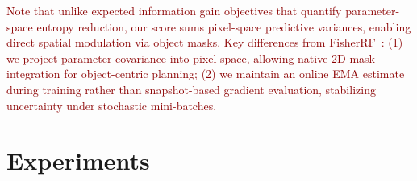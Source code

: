 \documentclass{egpubl}
\newcommand{\rev}[1]{\textcolor{darkred}{#1}}
\begin{document}
\rev{Note that unlike expected information gain objectives that quantify parameter-space entropy reduction, our score sums pixel-space predictive variances, enabling direct spatial modulation via object masks. Key differences from FisherRF~\cite{jiangFisherRFActiveView2024}: (1) we project parameter covariance into pixel space, allowing native 2D mask integration for object-centric planning; (2) we maintain an online EMA estimate during training rather than snapshot-based gradient evaluation, stabilizing uncertainty under stochastic mini-batches.}
\vspace{-2mm}



\section{Experiments}
\end{document}
